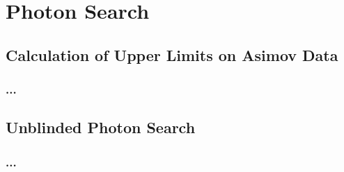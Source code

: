 
\chapter{Photon Search}
\label{chap:photon-search}

\section{Calculation of Upper Limits on Asimov Data}
\subsection{...}

\section{Unblinded Photon Search}
\subsection{...}

